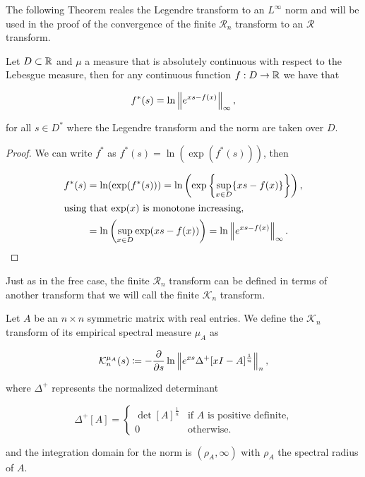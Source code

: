     The following Theorem reales the Legendre transform to an $L^\infty$ norm and will be used in the proof of the convergence of the finite $\mathcal R_n$ transform to an $\mathcal R$ transform.

\begin{lemma} \label{lemma:legendre_transform_norm}
    Let $D \subset \mathbb R$ and $\mu$ a measure that is absolutely continuous with respect to the Lebesgue measure, then for any continuous function $f: D \to \mathbb R$ we have that

    \begin{equation*}
        f^*(s) = \ln \left\lVert e^{xs - f(x)} \right\rVert_{\infty},
    \end{equation*}

    \noindent for all $s \in D^*$ where the Legendre transform and the norm are taken over $D$.
\end{lemma}

\begin{proof}
    We can write $f^*$ as $f^*(s) = \ln(\exp(f^*(s)))$, then

    \begin{align*}
        f^*(s) &= \ln(\exp(f^*(s))) = \ln \left(\exp\left\{ \sup_{x\in D} \{xs-f(x)\} \right\}\right), \\
        \intertext{using that $\exp(x)$ is monotone increasing,}
        &= \ln \left( \sup_{x \in D} \exp(xs - f(x))\right) = \ln \left\lVert e^{xs-f(x)} \right\rVert_{\infty}.
    \end{align*}
\end{proof}


Just as in the free case, the finite $\mathcal R_n$ transform can be defined in terms of another transform that we will call the finite $\mathcal K_n$ transform.


\begin{definition}
    Let $A$ be an $n\times n$ symmetric matrix with real entries. We define the $\mathcal K_n$ transform of its empirical spectral measure $\mu_A$ as 

    \begin{equation*}
        \mathcal K_n^{\mu_A} (s) \coloneqq - \frac{\partial}{\partial s} \ln \left\lVert e^{xs} \Delta^+ [x I - A]^{\frac1n} \right\rVert_n,
    \end{equation*}

    \noindent where $\Delta^+$ represents the normalized determinant
    
    \begin{equation*}
        \Delta^+[A] = \left\{ \begin{array}{cc}
            \det[A]^{\frac1n} & \text{if $A$ is positive definite,}\\
            0 & \text{otherwise.}
        \end{array} \right.
    \end{equation*}
    
    \noindent and the integration domain for the norm is $(\rho_A, \infty)$ with $\rho_A$ the spectral radius of $A$.
\end{definition}

